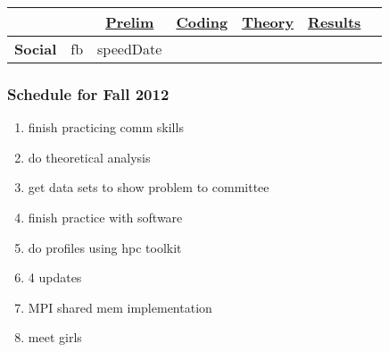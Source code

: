 \begin{frame}
\begin{table}[h!]
  \begin{center}
    \small
    \begin{tabular}{ | c || c || c || c || c || c || c ||}
      \hline 
      & \underline{} & \underline{Prelim} & \underline{Coding} & \underline{Theory}  & \underline{Results} \\ 
      \hline
      \tiny \textbf{Social} & \tiny fb & \tiny speedDate & \tiny  & \tiny   \\ 
      \hline 
    \end{tabular}
  \end{center}

\end{table}
\end{frame} 


\begin{frame} 

\frametitle{Schedule for Fall 2012} 

\begin{enumerate}
\item finish practicing comm skills
\item do theoretical analysis 
\item get data sets to show problem to committee
\item finish practice with software
\item do profiles using hpc toolkit
\item 4 updates
\item MPI shared mem implementation
\item meet girls 
\end{enumerate} 

\end{frame}
